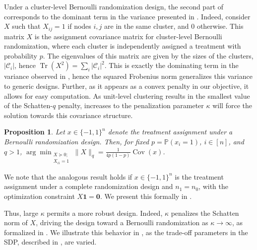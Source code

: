 \documentclass[12pt]{article}
\newtheorem{proposition}[theorem]{Proposition}
\theoremstyle{definition}
\numberwithin{equation}{section}
\numberwithin{figure}{section}
\numberwithin{equation}{section}
\numberwithin{figure}{section}
\begin{document}
Under a cluster-level Bernoulli randomization design, the second part of  corresponds to the dominant term in the variance presented in \citet{viviano2023causal}. Indeed, consider $X$ such that $X_{ij} = 1$ if nodes $i,j$ are in the same cluster, and 0 otherwise. This matrix $X$ is the assignment covariance matrix for cluster-level Bernoulli randomization, where each cluster is independently assigned a treatment with probability $p$. The eigenvalues of this matrix are given by the sizes of the clusters, $|\mathcal{C}_i|$, hence $\operatorname{Tr}(X^2) = \sum_i |\mathcal{C}_i|^2$. This is exactly the dominating term in the variance observed in \citet[Theorem 3.2]{viviano2023causal}, hence the squared Frobenius norm generalizes this variance to generic designs. Further, as it appears as a convex penalty in our objective, it allows for easy computation. 
As unit-level clustering results in the smallest value of the Schatten-$q$ penalty, increases to the penalization parameter $\kappa$ will force the solution towards this covariance structure.

\begin{proposition}\label{prop:X_norm_covariance_min}
Let $x \in \{-1,1\}^n$ denote the treatment assignment under a Bernoulli randomization design. Then, for fixed $p= \mathbb{P}(x_i = 1)$, $i \in [n]$, and $q>1$, $\arg \min_{\substack{X \succeq 0; \\ X_{ii}=1}} \|X\|_{q} = \frac{1}{4p(1-p)}\operatorname{Cov}(x)$.
\end{proposition}

We note that the analogous result holds if $x \in \{-1,1\}^n$ is the treatment assignment under a complete randomization design and $n_1 = n_0$, with the optimization constraint $X \mathbf{1} = \mathbf{0}$. We present this formally in .

Thus, large $\kappa$ permits a more robust design. Indeed, $\kappa$ penalizes the Schatten norm of $X$, driving the design toward a Bernoulli randomization as $\kappa\to \infty$, as formalized in . We illustrate this behavior in , as the trade-off parameters in the SDP, described in , are varied. 
\end{document}
